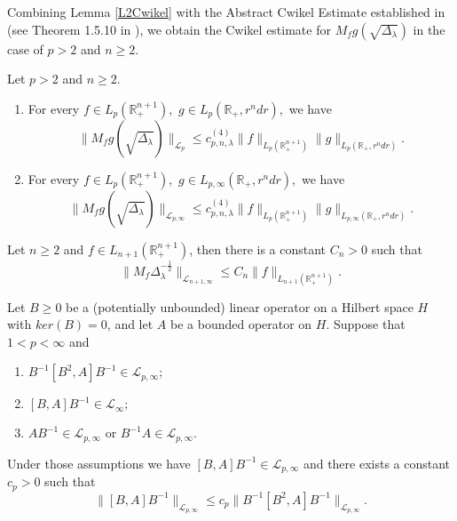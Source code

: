 \documentclass{amsart}
\begin{document}
Combining  Lemma \ref{L2Cwikel} with the Abstract Cwikel Estimate established in \cite{LeSZ} (see Theorem 1.5.10 in \cite{LSZ2}), we obtain the Cwikel estimate for $M_fg(\sqrt{\Delta_{\lambda}})$ in the case of $p>2$ and $n\geq 2.$

\begin{theorem}\label{cwikel estimate in bessel setting}
Let $p>2$ and $n\geq 2.$
\begin{enumerate}[{\rm (i)}]
\item For every $f\in L_p(\mathbb{R}_+^{n+1}),$ $g\in L_p(\mathbb{R}_+,r^ndr),$  we have
$$\|M_fg(\sqrt{\Delta_{\lambda}})\|_{\mathcal{L}_p}\leq c_{p,n,\lambda}^{(4)}\|f\|_{L_p(\mathbb{R}_+^{n+1})}\|g\|_{L_{p}(\mathbb{R}_+,r^ndr)}.$$
\item For every $f\in L_p(\mathbb{R}_+^{n+1}),$ $g\in L_{p,\infty}(\mathbb{R}_+,r^ndr),$ we have
$$\|M_fg(\sqrt{\Delta_{\lambda}})\|_{\mathcal{L}_{p,\infty}}\leq c_{p,n,\lambda}^{(4)}\|f\|_{L_p(\mathbb{R}_+^{n+1})}\|g\|_{L_{p,\infty}(\mathbb{R}_+,r^ndr)}.$$
\end{enumerate}
\end{theorem}



\begin{coro}\label{Cwikelspecial}
Let $n\geq 2$ and $f\in L_{n+1}(\mathbb{R}_+^{n+1})$, then there is a constant $C_n>0$ such that
$$\|M_f\Delta_{\lambda}^{-\frac12}\|_{\mathcal{L}_{n+1,\infty}}\leq C_n\|f\|_{L_{n+1}(\mathbb{R}_+^{n+1})}.$$
\end{coro}

\begin{lemma}\cite[Lemma 4.4]{MR4654013}\label{surprisingly_technical_lemma}
Let $B\geq 0$ be a (potentially unbounded) linear operator on a Hilbert space $H$ with $ker(B)=0$, and let $A$ be a bounded operator on $H$. Suppose that $1<p<\infty$ and
\begin{enumerate}[{\rm (i)}]
\item $B^{-1}[B^2,A]B^{-1}\in\mathcal{L}_{p,\infty};$
\item $[B,A]B^{-1}\in\mathcal{L}_{\infty};$
\item $AB^{-1}\in\mathcal{L}_{p,\infty}$ or $B^{-1}A\in\mathcal{L}_{p,\infty}.$
\end{enumerate}
Under those assumptions we have $[B,A]B^{-1} \in \mathcal{L}_{p,\infty}$ and there exists a constant $c_p>0$ such that
$$\|[B,A]B^{-1}\|_{\mathcal{L}_{p,\infty}} \leq c_p\|B^{-1}[B^2,A]B^{-1}\|_{\mathcal{L}_{p,\infty}}.$$
\end{lemma}
\end{document}
